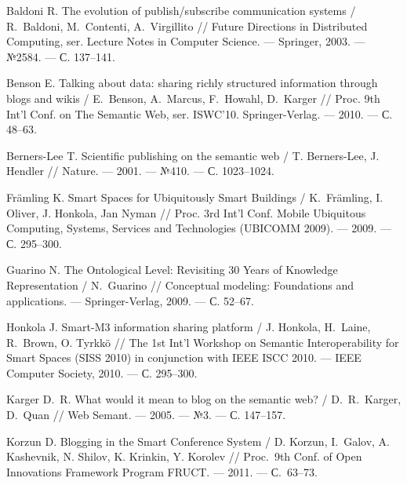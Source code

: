 \newpage

\renewcommand{\bibname}{Библиографический список использованной литературы}
\begin{thebibliography}{99}
\vspace{5mm}

Baldoni R. The evolution of publish/subscribe communication systems / 
R.~Baldoni, M.~Contenti, A.~Virgillito // Future Directions in Distributed Computing, ser. Lecture Notes in Computer Science. --- Springer, 2003. --- №2584. --- С. 137--141.

Benson E. Talking about data: sharing richly structured information through blogs and wikis / 
E.~Benson, A.~Marcus, F.~Howahl, D.~Karger // Proc. 9th Int'l Conf. on The Semantic Web, ser. ISWC'10. Springer-Verlag. --- 2010. --- С. 48--63.

Berners-Lee T. Scientific publishing on the semantic web / T. Berners-Lee, J. Hendler // Nature. --- 2001. --- №410. --- С. 1023--1024.

Fr\"amling K. Smart Spaces for Ubiquitously Smart Buildings / K.~Fr\"amling, I. Oliver, J. Honkola, Jan Nyman // 
Proc. 3rd Int'l Conf. Mobile Ubiquitous Computing, Systems, Services and Technologies (UBICOMM 2009). --- 2009. --- С. 295--300.

Guarino N. The Ontological Level: Revisiting 30 Years of Knowledge Representation / 
N.~Guarino // Conceptual modeling: Foundations and applications. --- Springer-Verlag, 2009. --- С. 52--67.

Honkola J. Smart-M3 information sharing platform / J. Honkola, H.~Laine, R.~Brown, O. Tyrkk\"o
// The 1st Int’l Workshop on Semantic Interoperability for Smart Spaces
(SISS 2010) in conjunction with IEEE ISCC 2010. --- IEEE Computer Society,
2010. --- С. 295--300.

Karger D.~R. What would it mean to blog on the semantic web? / D.~R.~Karger, D.~Quan // 
Web Semant. --- 2005. --- №3. --- С. 147--157.

Korzun D.  Blogging in the Smart Conference System / D. Korzun, I.~Galov, A. Kashevnik, N. Shilov, K. Krinkin, Y. Korolev // Proc.~9th Conf. of Open Innovations Framework Program FRUCT. --- 2011. --- С.~63--73.


\end{thebibliography}
